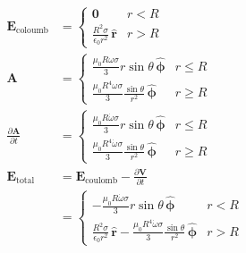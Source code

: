 \documentclass{article}
\renewcommand{\vec}[1]{\boldsymbol{\mathbf{#1}}}
\newcommand{\uvec}[1]{\hat{\vec{#1}}}
\begin{document}
\begin{enumerate}
        \begin{align*}
          \vec{E}_\text{coloumb}              & = \begin{cases}
                                                    \vec{0}                                      & r < R \\
                                                    \frac{R^2 \sigma}{\epsilon_0 r^2} \,\uvec{r} & r > R
                                                  \end{cases}                                                                                            \\
          \vec{A}                             & = \begin{cases}
                                                    \frac{\mu_0 R \omega \sigma}{3} r \sin \theta \,\uvec{\phi}             & r \le R \\
                                                    \frac{\mu_0 R^4 \omega \sigma}{3} \frac{\sin \theta}{r^2} \,\uvec{\phi} & r \ge R
                                                  \end{cases}                                                               \\
          \frac{\partial \vec{A}}{\partial t} & = \begin{cases}
                                                    \frac{\mu_0 R \dot{\omega} \sigma}{3} r \sin \theta \,\uvec{\phi}             & r \le R \\
                                                    \frac{\mu_0 R^4 \dot{\omega} \sigma}{3} \frac{\sin \theta}{r^2} \,\uvec{\phi} & r \ge R
                                                  \end{cases}                                              \\
          \vec{E}_\text{total}                & = \vec{E}_\text{coulomb} - \frac{\partial \vec{V}}{\partial t}                                                                                    \\
                                              & = \begin{cases}
                                                    -\frac{\mu_0 R \dot{\omega} \sigma}{3} r \sin \theta \,\uvec{\phi}                                                           & r < R \\
                                                    \frac{R^2 \sigma}{\epsilon_0 r^2} \,\uvec{r} - \frac{\mu_0 R^4 \dot{\omega} \sigma}{3} \frac{\sin \theta}{r^2} \,\uvec{\phi} & r > R
                                                  \end{cases}
        \end{align*}
\end{enumerate}
\end{document}
